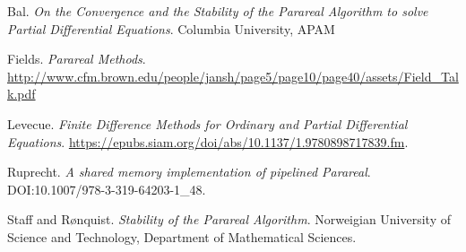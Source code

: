 \begin{thebibliography}{9}
Bal.
\textit{On the Convergence and the Stability of the Parareal Algorithm to solve
Partial Differential Equations}.
Columbia University, APAM

Fields.
\textit{Parareal Methods}.
\url{http://www.cfm.brown.edu/people/jansh/page5/page10/page40/assets/Field_Talk.pdf}

Levecue.
\textit{Finite Difference Methods for Ordinary and Partial Differential
  Equations}.
\url{https://epubs.siam.org/doi/abs/10.1137/1.9780898717839.fm}.

Ruprecht.
\textit{A shared memory implementation of pipelined Parareal}.
DOI:10.1007/978-3-319-64203-1\_48.

Staff and R{\o}nquist.
\textit{Stability of the Parareal Algorithm}.
Norweigian University of Science and Technology, Department of Mathematical
Sciences.


\end{thebibliography}
